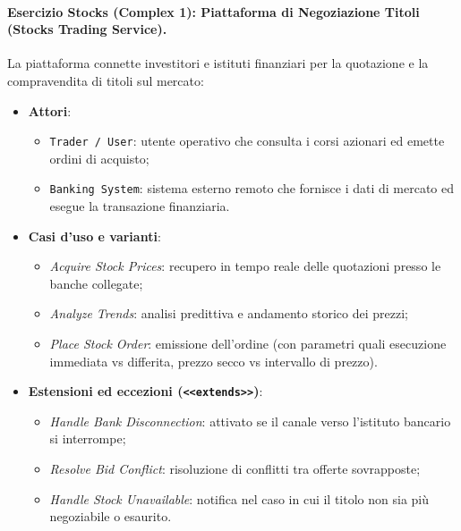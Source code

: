 \documentclass[12pt]{extarticle}
\newcommand{\actor}[4]{\begin{scope}[shift={(#2,#3)}]
  \node[circle,draw,semithick,minimum size=0.4cm,inner sep=0] at (0,0.55) {};
  \draw[semithick] (0,0.35)--(0,-0.2) (-0.3,0.15)--(0.3,0.15) (0,-0.2)--(-0.25,-0.7) (0,-0.2)--(0.25,-0.7);
  \node[minimum width=0.8cm,minimum height=1.4cm] (#1) at (0,0) {};
  \node[font=\footnotesize\sffamily,anchor=north,align=center] at (0,-0.75) {#4};
\end{scope}}
\newcommand{\sysbox}[5]{\draw[semithick] (#1,#2) rectangle (#3,#4); \node[font=\small\bfseries\sffamily, anchor=north] at ({(#1+#3)/2},#4-0.1) {#5};}
\begin{document}
\begin{figure}[H]
    \centering
{}
    \label{fig:oocm_taxi}
\end{figure}

\paragraph{Esercizio Stocks (Complex 1): Piattaforma di Negoziazione Titoli (Stocks Trading Service).}
La piattaforma connette investitori e istituti finanziari per la quotazione e la compravendita di titoli sul mercato:
\begin{itemize}
    \item \textbf{Attori}:
    \begin{itemize}
        \item \texttt{Trader / User}: utente operativo che consulta i corsi azionari ed emette ordini di acquisto;
        \item \texttt{Banking System}: sistema esterno remoto che fornisce i dati di mercato ed esegue la transazione finanziaria.
    \end{itemize}
    \item \textbf{Casi d'uso e varianti}:
    \begin{itemize}
        \item \textit{Acquire Stock Prices}: recupero in tempo reale delle quotazioni presso le banche collegate;
        \item \textit{Analyze Trends}: analisi predittiva e andamento storico dei prezzi;
        \item \textit{Place Stock Order}: emissione dell'ordine (con parametri quali esecuzione immediata vs differita, prezzo secco vs intervallo di prezzo).
    \end{itemize}
    \item \textbf{Estensioni ed eccezioni (\texttt{<<extends>>})}:
    \begin{itemize}
        \item \textit{Handle Bank Disconnection}: attivato se il canale verso l'istituto bancario si interrompe;
        \item \textit{Resolve Bid Conflict}: risoluzione di conflitti tra offerte sovrapposte;
        \item \textit{Handle Stock Unavailable}: notifica nel caso in cui il titolo non sia più negoziabile o esaurito.
    \end{itemize}
\end{itemize}
\end{document}
